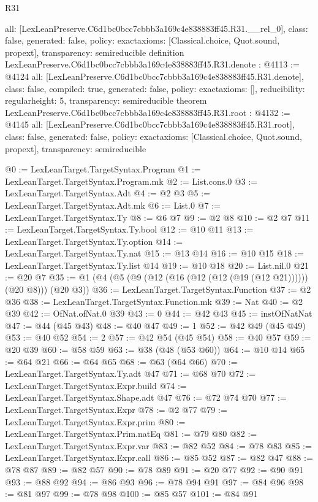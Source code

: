 \begin{lexlean}{R31}
\begin{coremodule}
{  all: [LexLeanPreserve.C6d1bc0bcc7cbbb3a169c4e838883ff45.R31.__rel_0],
  class: false,
  generated: false,
  policy: exact{axioms: [Classical.choice, Quot.sound, propext]},
  transparency: semireducible
}
definition LexLeanPreserve.C6d1bc0bcc7cbbb3a169c4e838883ff45.R31.denote : @4113 := @4124 {
  all: [LexLeanPreserve.C6d1bc0bcc7cbbb3a169c4e838883ff45.R31.denote],
  class: false,
  compiled: true,
  generated: false,
  policy: exact{axioms: []},
  reducibility: regular{height: 5},
  transparency: semireducible
}
theorem LexLeanPreserve.C6d1bc0bcc7cbbb3a169c4e838883ff45.R31.root : @4132 := @4145 {
  all: [LexLeanPreserve.C6d1bc0bcc7cbbb3a169c4e838883ff45.R31.root],
  class: false,
  generated: false,
  policy: exact{axioms: [Classical.choice, Quot.sound, propext]},
  transparency: semireducible
}

@0 := LexLeanTarget.TargetSyntax.Program
@1 := LexLeanTarget.TargetSyntax.Program.mk
@2 := List.cons.{0}
@3 := LexLeanTarget.TargetSyntax.Adt
@4 := @2 @3
@5 := LexLeanTarget.TargetSyntax.Adt.mk
@6 := List.{0}
@7 := LexLeanTarget.TargetSyntax.Ty
@8 := @6 @7
@9 := @2 @8
@10 := @2 @7
@11 := LexLeanTarget.TargetSyntax.Ty.bool
@12 := @10 @11
@13 := LexLeanTarget.TargetSyntax.Ty.option
@14 := LexLeanTarget.TargetSyntax.Ty.nat
@15 := @13 @14
@16 := @10 @15
@18 := LexLeanTarget.TargetSyntax.Ty.list @14
@19 := @10 @18
@20 := List.nil.{0}
@21 := @20 @7
@35 := @1 (@4 (@5 (@9 (@12 (@16 (@12 (@12 (@19 (@12 @21)))))) (@20 @8))) (@20 @3))
@36 := LexLeanTarget.TargetSyntax.Function
@37 := @2 @36
@38 := LexLeanTarget.TargetSyntax.Function.mk
@39 := Nat
@40 := @2 @39
@42 := OfNat.ofNat.{0} @39
@43 := 0
@44 := @42 @43
@45 := instOfNatNat
@47 := @44 (@45 @43)
@48 := @40 @47
@49 := 1
@52 := @42 @49 (@45 @49)
@53 := @40 @52
@54 := 2
@57 := @42 @54 (@45 @54)
@58 := @40 @57
@59 := @20 @39
@60 := @58 @59
@63 := @38 (@48 (@53 @60))
@64 := @10 @14
@65 := @64 @21
@66 := @64 @65
@68 := @63 (@64 @66)
@70 := LexLeanTarget.TargetSyntax.Ty.adt @47
@71 := @68 @70
@72 := LexLeanTarget.TargetSyntax.Expr.build
@74 := LexLeanTarget.TargetSyntax.Shape.adt @47
@76 := @72 @74 @70
@77 := LexLeanTarget.TargetSyntax.Expr
@78 := @2 @77
@79 := LexLeanTarget.TargetSyntax.Expr.prim
@80 := LexLeanTarget.TargetSyntax.Prim.natEq
@81 := @79 @80
@82 := LexLeanTarget.TargetSyntax.Expr.var
@83 := @82 @52
@84 := @78 @83
@85 := LexLeanTarget.TargetSyntax.Expr.call
@86 := @85 @52
@87 := @82 @47
@88 := @78 @87
@89 := @82 @57
@90 := @78 @89
@91 := @20 @77
@92 := @90 @91
@93 := @88 @92
@94 := @86 @93
@96 := @78 @94 @91
@97 := @84 @96
@98 := @81 @97
@99 := @78 @98
@100 := @85 @57
@101 := @84 @91

\end{coremodule}
\end{lexlean}
